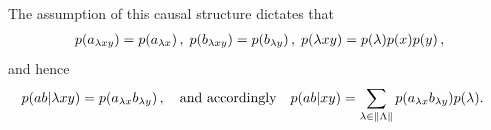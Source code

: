 The assumption of this causal structure dictates that
\begin{align}\begin{split}\label{eq:bellstructureNEW}
\p{a_{\lambda x y}}=\p{a_{\lambda x}} \,,\; \p{b_{\lambda x y}}=\p{b_{\lambda y}} \,,\; \p{\lambda x y}=\p{\lambda}\p{x}\p{y} \,,%
\end{split}\end{align}
and hence
\begin{align}\begin{split}\label{eq:bellintegrationNEW}
&p\lparen a b | \lambda x y\rparen=p\lparen a_{\lambda x} b_{\lambda y}\rparen\,,\quad\text{and accordingly}\quad p\lparen a b | x y\rparen=\sum\limits_{{\lambda\in \lVert\Lambda\rVert}}p\lparen a_{\lambda x} b_{\lambda y}\rparen p\lparen\lambda\rparen.
\end{split}\end{align}


